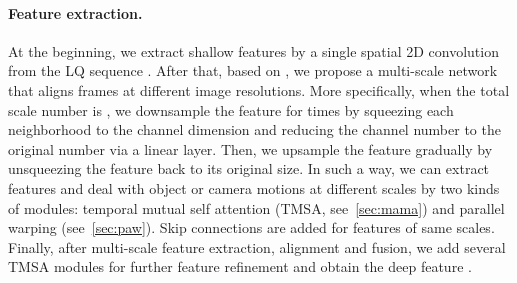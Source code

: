 \documentclass[10pt,twocolumn,letterpaper]{article}
\newlength \g
\begin{document}
\paragraph{Feature extraction.}
At the beginning, we extract shallow features  by a single spatial 2D convolution from the LQ sequence . After that, based on \cite{ronneberger2015u}, we propose a multi-scale network that aligns frames at different image resolutions. More specifically, when the total scale number is , we downsample the feature for  times by squeezing each  neighborhood to the channel dimension and reducing the channel number to the original number via a linear layer. Then, we upsample the feature gradually by unsqueezing the feature back to its original size. In such a way, we can extract features and deal with object or camera motions at different scales by two kinds of modules: temporal mutual self attention (TMSA, see~\ref{sec:mama}) and parallel warping (see~\ref{sec:paw}). Skip connections are added for features of same scales. Finally, after multi-scale feature extraction, alignment and fusion, we add several TMSA modules for further feature refinement and obtain the deep feature .
\end{document}
